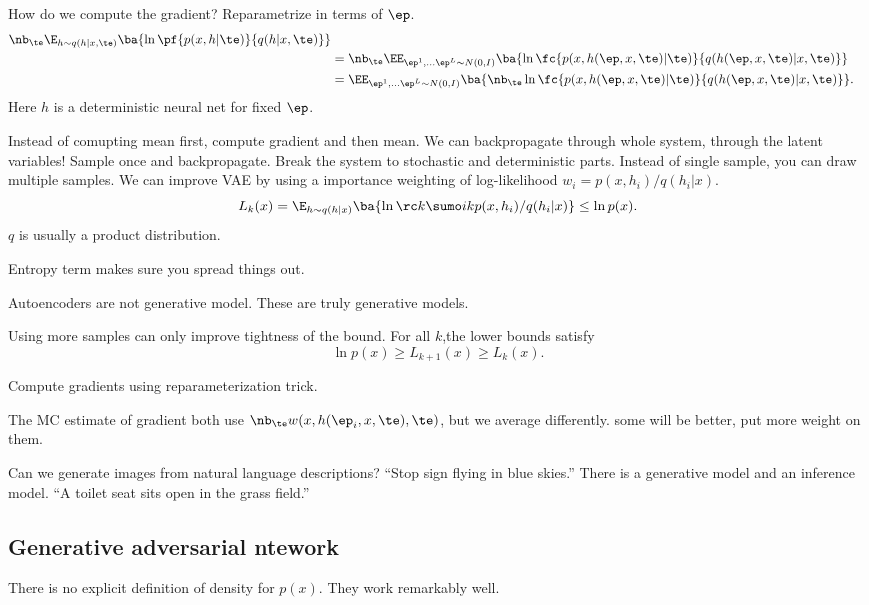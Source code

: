 How do we compute the gradient? Reparametrize in terms of $\ep$.
\begin{align}
\nb_\te \E_{h\sim q(h|x,\te)} \ba{\ln \pf{p(x,h|\te)}{q(h|x,\te)}}\\
&=\nb_\te \EE_{\ep^1,\ldots \ep^L\sim N(0,I)} \ba{\ln \fc{p(x,h(\ep,x,\te)|\te)}{q(h(\ep,x,\te)|x,\te)}}\\
&=\EE_{\ep^1,\ldots \ep^L\sim N(0,I)} \ba{\nb_\te \ln \fc{p(x,h(\ep,x,\te)|\te)}{q(h(\ep,x,\te)|x,\te)}}.
\end{align}
Here $h$ is a deterministic neural net for fixed $\ep$.

Instead of comupting mean first, compute gradient and then mean. We can backpropagate through whole system, through the latent variables! Sample once and backpropagate. Break the system to stochastic and deterministic parts.  Instead of single sample, you can draw multiple samples. We can improve VAE by using a importance weighting of log-likelihood $w_i=p(x,h_i)/q(h_i|x)$. %
$$
L_k (x) = \E_{h\sim q(h|x)} \ba{\ln \rc k \sumo ik p(x,h_i)/q(h_i|x)} \le \ln p(x).
$$
$q$ is usually a product distribution.

Entropy term makes sure you spread things out.

Autoencoders are not generative model. These are truly generative models.

Using more samples can only improve tightness of the bound. For all $k$,the lower bounds satisfy
$$
\ln p(x) \ge L_{k+1}(x) \ge L_k(x).
$$

Compute gradients using reparameterization trick.

The MC estimate of gradient both use $\nb_\te w(x,h(\ep_i,x,\te),\te)$, but we average differently. %
some will be better, put more weight on them.

Can we generate images from natural language descriptions? ``Stop sign flying in blue skies.''
There is a generative model and an inference model. ``A toilet seat sits open in the grass field.''

\subsection{Generative adversarial ntework}

There is no explicit definition of density for $p(x)$. 
They work remarkably well.

